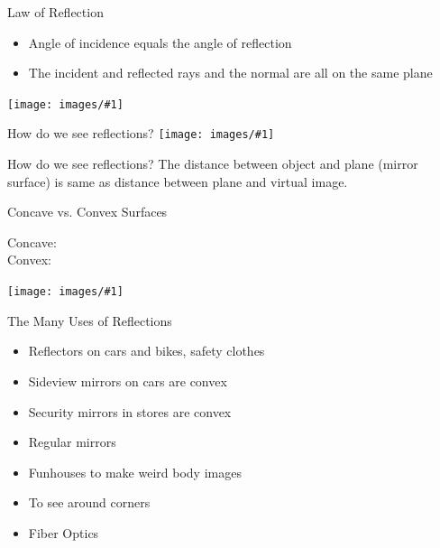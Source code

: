 \documentclass[t]{beamer}
\newcommand{\img}[1]{\texttt{[image: images/\#1]}}
\newcommand{\imgs}[1]{\texttt{[image: images/\#1]}}
\newcommand{\bi}{\begin{itemize}}
\newcommand{\ei}{\end{itemize}}
\begin{document}
\begin{frame}{Law of Reflection}
\bi
\item Angle of incidence equals the angle of reflection
\item The incident and reflected rays and the normal are all on the same plane
\ei
\img{law_of_reflection.png}
\end{frame}

\begin{frame}{How do we see reflections?}
\imgs{mirror.jpg}
\end{frame}

\begin{frame}{How do we see reflections?}
The distance between object and plane (mirror surface) is same as distance between plane and virtual image.
\end{frame}

\begin{frame}{Concave vs. Convex Surfaces}
\begin{description}
\item[Concave:] 
\item[Convex:] 
\end{description}
\imgs{spoon.jpg}
\end{frame}

\begin{frame}{The Many Uses of Reflections}
\bi
\item Reflectors on cars and bikes, safety clothes
\item Sideview mirrors on cars are convex
\item Security mirrors in stores are convex
\item Regular mirrors
\item Funhouses to make weird body images
\item To see around corners
\item Fiber Optics
\ei
\end{frame}
\end{document}
